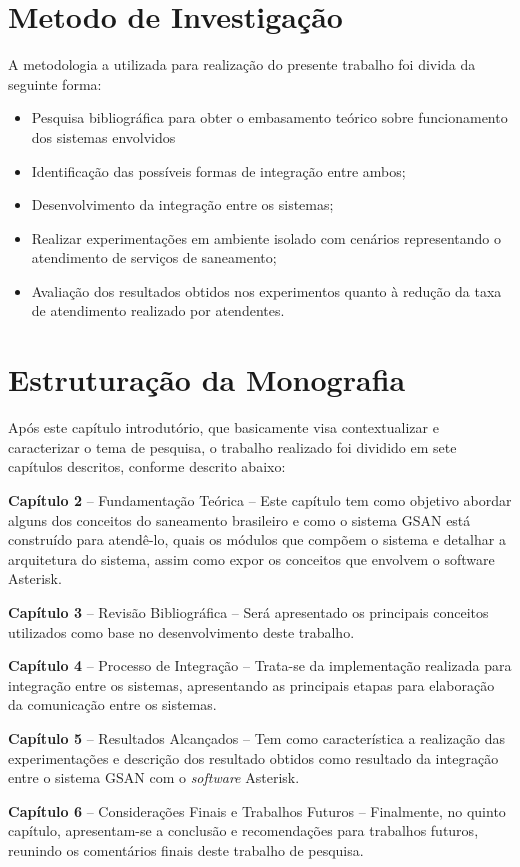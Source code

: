 \section{Metodo de Investigação}
A metodologia a utilizada para realização do presente trabalho foi divida da seguinte forma:
\begin{itemize}
	\item Pesquisa bibliográfica para obter o embasamento teórico sobre funcionamento dos sistemas envolvidos
	\item Identificação das possíveis formas de integração entre ambos;
	\item Desenvolvimento da integração entre os sistemas;
	\item Realizar experimentações em ambiente isolado com cenários representando o atendimento de serviços de saneamento; 
	\item Avaliação dos resultados obtidos nos experimentos quanto à redução da taxa de atendimento realizado por atendentes.
\end{itemize}

\section{Estruturação da Monografia}
	
Após este capítulo introdutório, que basicamente visa contextualizar e caracterizar o tema de pesquisa, o trabalho realizado foi dividido em sete capítulos descritos, conforme descrito abaixo:
\begin{description}
	\item \textbf{Capítulo 2} – Fundamentação Teórica – Este capítulo tem como objetivo abordar alguns dos conceitos do saneamento brasileiro e como o sistema GSAN está construído para atendê-lo, quais os módulos que compõem o sistema e detalhar a arquitetura do sistema, assim como expor os conceitos que envolvem o software Asterisk.
	\item \textbf{Capítulo 3 } – Revisão Bibliográfica – Será apresentado os principais conceitos utilizados como base no desenvolvimento deste trabalho.
	\item \textbf{Capítulo  4} – Processo de Integração – Trata-se da implementação realizada para integração entre os sistemas, apresentando as principais etapas para elaboração da comunicação entre os sistemas.
	\item \textbf{Capítulo  5} – Resultados Alcançados – Tem como característica a realização das experimentações e descrição dos resultado obtidos como resultado da integração entre o sistema GSAN com o \textit{software} Asterisk.
	\item \textbf{Capítulo 6} – Considerações Finais e Trabalhos Futuros – Finalmente, no quinto capítulo, apresentam-se a conclusão e recomendações para trabalhos futuros, reunindo os comentários finais deste trabalho de pesquisa.	
\end{description}
	





